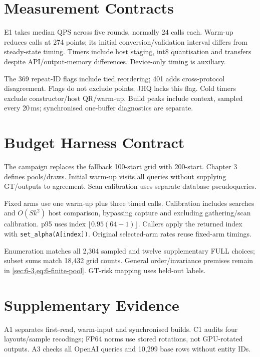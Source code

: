 \section{Measurement Contracts}
\label{sec:a-e1-protocol}

E1 takes median QPS across five rounds, normally 24 calls each. Warm-up reduces calls at 274 points; its initial conversion/validation interval differs from steady-state timing. Timers include host staging, int8 quantisation and transfers despite API/output-memory differences. Device-only timing is auxiliary.

The 369 repeat-ID flags include tied reordering; 401 adds cross-protocol disagreement. Flags do not exclude points; JHQ lacks this flag. Cold timers exclude constructor/host QR/warm-up. Build peaks include context, sampled every 20\,ms; synchronised one-buffer diagnostics are separate.

\section{Budget Harness Contract}
\label{sec:a-budget-contract}

The campaign replaces the fallback 100-start grid with 200-start. Chapter 3 defines pools/draws. Initial warm-up visits all queries without supplying GT/outputs to agreement. Scan calibration uses separate database pseudoqueries.

Fixed arms use one warm-up plus three timed calls. Calibration includes searches and $O(Sk^2)$ host comparison, bypassing capture and excluding gathering/scan calibration. p95 uses index $\lfloor0.95(64-1)\rfloor$. Callers apply the returned index with \texttt{set\_alpha(A[index])}. Original selected-arm rates reuse fixed-arm timings.

Enumeration matches all 2,304 sampled and twelve supplementary FULL choices; subset sums match 18,432 grid counts. General order/invariance premises remain in \cref{sec:6-3,eq:6-finite-pool}. GT-risk mapping uses held-out labels.

\section{Supplementary Evidence}
\label{sec:a-supplement}

A1 separates first-read, warm-input and synchronised builds. C1 audits four layouts/sample recodings; FP64 norms use stored rotations, not GPU-rotated outputs. A3 checks all OpenAI queries and 10,299 base rows without entity IDs.

